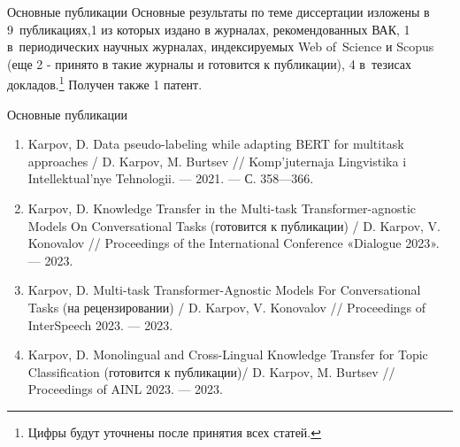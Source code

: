 \begin{frame}{Основные публикации}
 Основные результаты по теме диссертации изложены в 9~публикациях,{1} из которых издано в журналах, рекомендованных ВАК, {1} в~периодических научных журналах, индексируемых Web of~Science и Scopus (еще 2 - принято в такие журналы и готовится к публикации), {4} в~тезисах докладов.\footnote{Цифры будут уточнены после принятия всех статей.} Получен также 1 патент.
\end{frame}
\begin{frame}{Основные публикации}
\begin{enumerate}
 \item Karpov, D. Data pseudo-labeling while adapting BERT for multitask
approaches  / D. Karpov, M. Burtsev // Komp’juternaja
Lingvistika i Intellektual’nye Tehnologii. — 2021. — С. 358—366.
\item  Karpov, D. Knowledge Transfer in the Multi-task Transformer-agnostic
Models On Conversational Tasks (готовится к публикации) /
D. Karpov, V. Konovalov // Proceedings of the International Conference
«Dialogue 2023». — 2023.
\item Karpov, D. Multi-task Transformer-Agnostic Models For Conversational
Tasks (на рецензировании) / D. Karpov, V. Konovalov //
Proceedings of InterSpeech 2023. — 2023.
\item Karpov, D. Monolingual and Cross-Lingual Knowledge Transfer for
Topic Classification (готовится к публикации)/ D. Karpov,
M. Burtsev // Proceedings of AINL 2023. — 2023.
\end{enumerate}
\end{frame}

